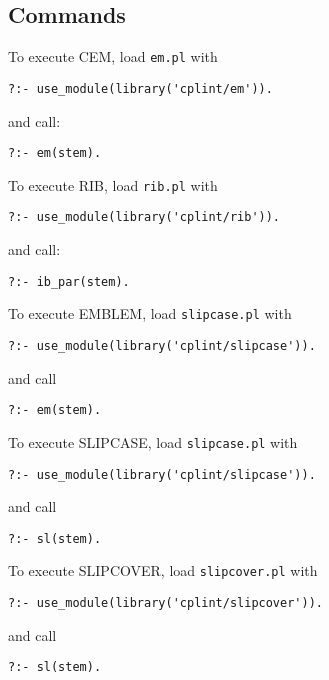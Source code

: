 \documentclass[a4paper,10pt]{article}
\begin{document}
\subsection{Commands}
To execute CEM, load \texttt{em.pl} with
\begin{verbatim}
?:- use_module(library('cplint/em')).
\end{verbatim}
and call:
\begin{verbatim}
?:- em(stem).
\end{verbatim}
To execute RIB, load \texttt{rib.pl} with
\begin{verbatim}
?:- use_module(library('cplint/rib')).
\end{verbatim}
and call:
\begin{verbatim}
?:- ib_par(stem).
\end{verbatim}
To execute EMBLEM, load \texttt{slipcase.pl} with
\begin{verbatim}
?:- use_module(library('cplint/slipcase')).
\end{verbatim}
and call
\begin{verbatim}
?:- em(stem).
\end{verbatim}
To execute SLIPCASE, load \texttt{slipcase.pl} with
\begin{verbatim}
?:- use_module(library('cplint/slipcase')).
\end{verbatim}
and call
\begin{verbatim}
?:- sl(stem).
\end{verbatim}
To execute SLIPCOVER, load \texttt{slipcover.pl} with
\begin{verbatim}
?:- use_module(library('cplint/slipcover')).
\end{verbatim}
and call
\begin{verbatim}
?:- sl(stem).
\end{verbatim}
\end{document}
